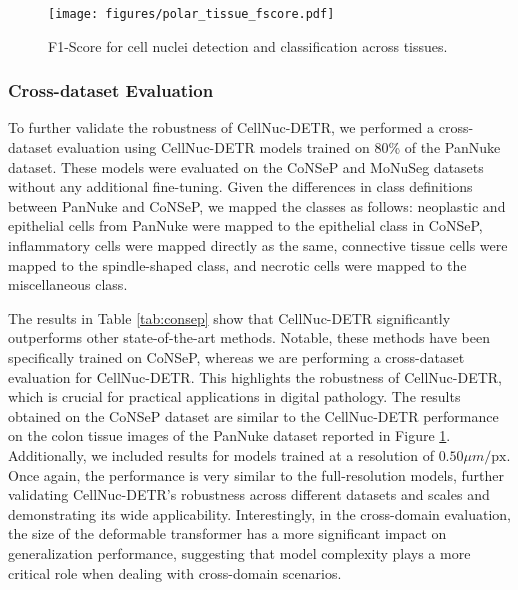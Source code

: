 \begin{figure}
    \centering
    \texttt{[image: figures/polar\_tissue\_fscore.pdf]}
    \caption{F1-Score for cell nuclei detection and classification across tissues.}
    \label{fig:results:radar}
\end{figure}

\subsubsection{Cross-dataset Evaluation}
\label{sec:results:numerical:cross}

To further validate the robustness of CellNuc-DETR, we performed a cross-dataset evaluation using CellNuc-DETR models trained on 80\% of the PanNuke dataset. These models were evaluated on the CoNSeP and MoNuSeg datasets without any additional fine-tuning. Given the differences in class definitions between PanNuke and CoNSeP, we mapped the classes as follows: neoplastic and epithelial cells from PanNuke were mapped to the epithelial class in CoNSeP, inflammatory cells were mapped directly as the same, connective tissue cells were mapped to the spindle-shaped class, and necrotic cells were mapped to the miscellaneous class.

The results in Table \ref{tab:consep} show that CellNuc-DETR significantly outperforms other state-of-the-art methods. Notable, these methods have been specifically trained on CoNSeP, whereas we are performing a cross-dataset evaluation for CellNuc-DETR.  This highlights the robustness of CellNuc-DETR, which is crucial for practical applications in digital pathology. The results obtained on the CoNSeP dataset are similar to the CellNuc-DETR performance on the colon tissue images of the PanNuke dataset reported in Figure \ref{fig:results:radar}. Additionally, we included results for models trained at a resolution of $0.50 \mu m/\text{px}$. Once again, the performance is very similar to the full-resolution models, further validating CellNuc-DETR's robustness across different datasets and scales and demonstrating its wide applicability. Interestingly, in the cross-domain evaluation, the size of the deformable transformer has a more significant impact on generalization performance, suggesting that model complexity plays a more critical role when dealing with cross-domain scenarios.


